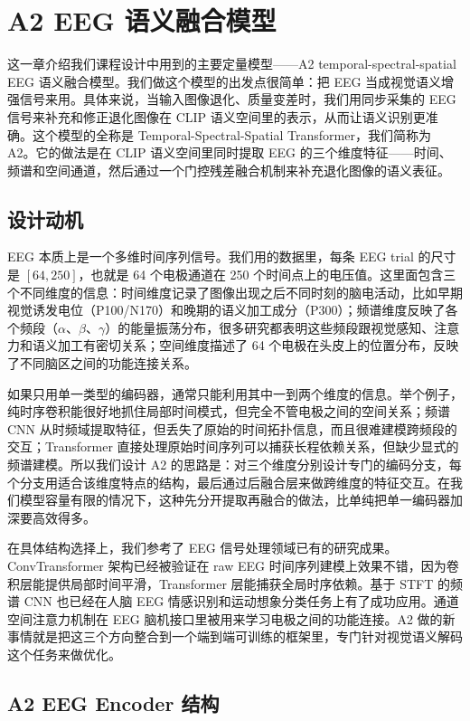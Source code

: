 \section{A2 EEG 语义融合模型}

这一章介绍我们课程设计中用到的主要定量模型——A2 temporal-spectral-spatial EEG 语义融合模型。我们做这个模型的出发点很简单：把 EEG 当成视觉语义增强信号来用。具体来说，当输入图像退化、质量变差时，我们用同步采集的 EEG 信号来补充和修正退化图像在 CLIP 语义空间里的表示，从而让语义识别更准确。这个模型的全称是 Temporal-Spectral-Spatial Transformer，我们简称为 A2。它的做法是在 CLIP 语义空间里同时提取 EEG 的三个维度特征——时间、频谱和空间通道，然后通过一个门控残差融合机制来补充退化图像的语义表征。

\subsection{设计动机}

EEG 本质上是一个多维时间序列信号。我们用的数据里，每条 EEG trial 的尺寸是 $[64, 250]$，也就是 64 个电极通道在 250 个时间点上的电压值。这里面包含三个不同维度的信息：时间维度记录了图像出现之后不同时刻的脑电活动，比如早期视觉诱发电位（P100/N170）和晚期的语义加工成分（P300）；频谱维度反映了各个频段（$\alpha$、$\beta$、$\gamma$）的能量振荡分布，很多研究都表明这些频段跟视觉感知、注意力和语义加工有密切关系；空间维度描述了 64 个电极在头皮上的位置分布，反映了不同脑区之间的功能连接关系。

如果只用单一类型的编码器，通常只能利用其中一到两个维度的信息。举个例子，纯时序卷积能很好地抓住局部时间模式，但完全不管电极之间的空间关系；频谱 CNN 从时频域提取特征，但丢失了原始的时间拓扑信息，而且很难建模跨频段的交互；Transformer 直接处理原始时间序列可以捕获长程依赖关系，但缺少显式的频谱建模。所以我们设计 A2 的思路是：对三个维度分别设计专门的编码分支，每个分支用适合该维度特点的结构，最后通过后融合层来做跨维度的特征交互。在我们模型容量有限的情况下，这种先分开提取再融合的做法，比单纯把单一编码器加深要高效得多。

在具体结构选择上，我们参考了 EEG 信号处理领域已有的研究成果。ConvTransformer 架构已经被验证在 raw EEG 时间序列建模上效果不错，因为卷积层能提供局部时间平滑，Transformer 层能捕获全局时序依赖。基于 STFT 的频谱 CNN 也已经在人脑 EEG 情感识别和运动想象分类任务上有了成功应用。通道空间注意力机制在 EEG 脑机接口里被用来学习电极之间的功能连接。A2 做的新事情就是把这三个方向整合到一个端到端可训练的框架里，专门针对视觉语义解码这个任务来做优化。

\subsection{A2 EEG Encoder 结构}

